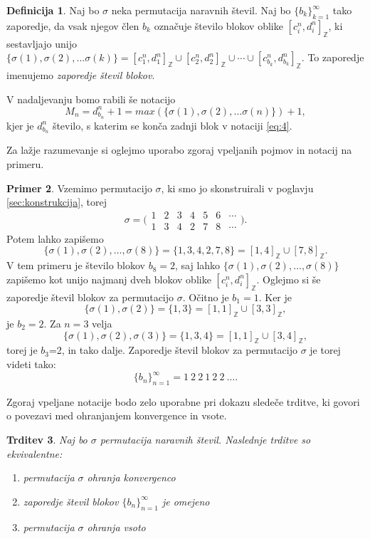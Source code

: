 \documentclass[12pt,a4paper,reqno]{amsart}
\theoremstyle{definition} %
\newtheorem{definicija}{Definicija}[section]
\newtheorem{primer}[definicija]{Primer}
\theoremstyle{plain} %
\newtheorem{trditev}[definicija]{Trditev}
\newcommand{\Z}{\mathbb Z}
\begin{document}
\begin{definicija}
Naj bo $\sigma$ neka permutacija naravnih števil. Naj bo $\{b_k\}^{\infty}_{k=1}$ tako zaporedje, da vsak njegov člen $b_k$ označuje število blokov oblike $[c^n_i, d^n_i]_{\Z}$, ki sestavljajo unijo $\{ \sigma (1), \sigma (2), \ldots \sigma (k) \} = [c^n_1, d^n_1]_{\Z} \cup [c^n_2, d^n_2]_{\Z} \cup \cdots \cup [c^n_{b_k}, d^n_{b_k}]_{\Z}$. To zaporedje imenujemo \emph{zaporedje števil blokov}.
\end{definicija}

V nadaljevanju bomo rabili še notacijo $$M_n=d^n_{b_n}+1=max(\{ \sigma (1), \sigma (2), \ldots \sigma (n) \})+1,$$ kjer je $d^n_{b_n}$ število, s katerim se konča zadnji blok v notaciji \eqref{eq:4}.

Za lažje razumevanje si oglejmo uporabo zgoraj vpeljanih pojmov in notacij na primeru.

\begin{primer}
Vzemimo permutacijo $\sigma$, ki smo jo skonstruirali v poglavju \ref{sec:konstrukcija}, torej 
$$\sigma = \bigg(\begin{matrix}
    1 & 2 & 3 & 4 & 5 & 6 & \cdots   \\   1 & 3 & 4 & 2 & 7 & 8 & \cdots
  \end{matrix}\bigg).$$
Potem lahko zapišemo $$\{\sigma(1), \sigma(2), \ldots, \sigma(8) \} = \{ 1,3,4,2,7,8\} = [1,4]_{\Z} \cup [7,8]_{\Z}.$$ V tem primeru je število blokov $b_8=2$, saj lahko $\{\sigma(1), \sigma(2), \ldots, \sigma(8) \}$ zapišemo kot unijo najmanj dveh blokov oblike  $[c^n_i, d^n_i]_{\Z}$.
Oglejmo si še zaporedje števil blokov za permutacijo $\sigma$. Očitno je $b_1=1$. Ker je $$\{\sigma(1), \sigma(2) \} = \{ 1,3\} = [1,1]_{\Z} \cup [3,3]_{\Z},$$ je $b_2=2$. Za $n=3$ velja $$\{\sigma(1), \sigma(2), \sigma(3) \} = \{ 1,3,4\} = [1,1]_{\Z} \cup [3,4]_{\Z},$$ torej je $b_3$=2, in tako dalje. Zaporedje števil blokov za permutacijo $\sigma$ je torej videti tako: $$\{b_n\}_{n=1}^{\infty}=1\:2\:2\:1\:2\:2\:\ldots.$$
\end{primer}

Zgoraj vpeljane notacije bodo zelo uporabne pri dokazu sledeče trditve, ki govori o povezavi med ohranjanjem konvergence in vsote.

\begin{trditev} \label{trd:ohranjanje}
Naj bo $\sigma$ permutacija naravnih števil. Naslednje trditve so ekvivalentne:
\begin{enumerate}
\item permutacija $\sigma$ ohranja konvergenco \label{itm:1}
\item zaporedje števil blokov $\{b_n\}^{\infty}_{n=1}$ je omejeno \label{itm:2}
\item permutacija $\sigma$ ohranja vsoto \label{itm:3}
\end{enumerate}
\end{trditev}
\end{document}
